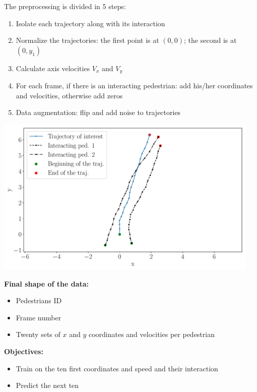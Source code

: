 \documentclass[a0,portrait]{a0poster}
\begin{document}
\begin{multicols}{2}
\begin{minipage}[]{0.5\linewidth}
The preprocessing is divided in 5 steps:
\begin{enumerate}
\item Isolate each trajectory along with its interaction
\item Normalize the trajectories: the first point is at $(0,0)$; the second is at $(0,y_1)$
\item Calculate axis velocities $V_x$ and $V_y$
\item For each frame, if there is an interacting pedestrian: add his/her coordinates and velocities, otherwise add zeros
\item Data augmentation: flip and add noise to trajectories
\end{enumerate}
\end{minipage}
\hfill
\begin{minipage}[]{0.5\linewidth}
\begin{center}
\centerline {\includegraphics[width=0.95\textwidth]{figure/afterrot}} 
\end{center}
\end{minipage}

\vspace{1cm}

\begin{minipage}[]{0.48\linewidth}
\textbf{Final shape of the data:}
\begin{itemize}
\item Pedestrians ID
\item Frame number 
\item Twenty sets of $x$ and $y$ coordinates and velocities per pedestrian
\end{itemize}
\end{minipage}
\hfill
\begin{minipage}[]{0.48\linewidth}
\textbf{Objectives:}
\begin{itemize}
\item Train on the ten first coordinates and speed and their interaction
\item Predict the next ten
\end{itemize}
\vspace{1cm}
\end{minipage}


\end{multicols}
\end{document}
